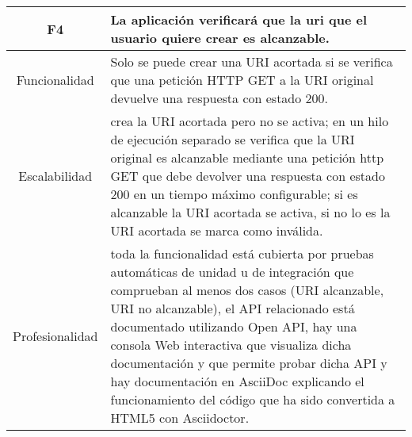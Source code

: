\documentclass{article}
\begin{document}
\begin{table}[hbtp]
    \footnotesize
    \centering
    \settowidth{}
    \setlength\extrarowheight{5pt}
    \begin{tabulary}{\textwidth}{ C L }
        \textbf{F4} & La aplicación verificará que la uri que el usuario quiere crear es alcanzable. 
        \\
    \hline
    
    Funcionalidad & Solo se puede crear una URI acortada si se verifica que una petición HTTP GET
    a la URI original devuelve una respuesta con estado 200.\\
        
    Escalabilidad & crea la URI acortada pero no se activa; en un hilo de ejecución separado se
    verifica que la URI original es alcanzable mediante una petición http GET que debe devolver
    una respuesta con estado 200 en un tiempo máximo configurable; si es alcanzable la URI
    acortada se activa, si no lo es la URI acortada se marca como inválida. \\

    Profesionalidad & toda la funcionalidad está cubierta por pruebas automáticas de unidad u de
    integración que comprueban al menos dos casos (URI alcanzable, URI no alcanzable), el API
    relacionado está documentado utilizando Open API, hay una consola Web interactiva que
    visualiza dicha documentación y que permite probar dicha API y hay documentación en
    AsciiDoc explicando el funcionamiento del código que ha sido convertida a HTML5 con
    Asciidoctor. \\

    \end{tabulary}
    
\end{table}
 
\end{document}
